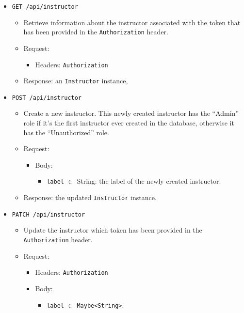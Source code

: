 \begin{chapterBody}
\begin{itemize}
    \item \texttt{GET /api/instructor}
    \begin{itemize}
        \item Retrieve information about the instructor associated with the token
that has been provided in the \texttt{Authorization} header.
        \item Request:
        \begin{itemize}
            \item Headers: \texttt{Authorization}
        \end{itemize}
        \item Response: an \texttt{Instructor} instance,
    \end{itemize}
\item \texttt{POST /api/instructor}
    \begin{itemize}
        \item Create a new instructor. This newly created instructor has the
``Admin'' role if it's the first instructor ever created in the database,
otherwise it has the ``Unauthorized'' role.
        \item Request:
        \begin{itemize}
            \item Body:
            \begin{itemize}
                \item \texttt{label} $ \in $ String: the label of the newly 
created instructor.
            \end{itemize}
        \end{itemize}
        \item Response: the updated \texttt{Instructor} instance.
    \end{itemize}
    \item \texttt{PATCH /api/instructor}
    \begin{itemize}
        \item Update the instructor which token has been provided in the
\texttt{Authorization} header.
        \item Request:
        \begin{itemize}
            \item Headers: \texttt{Authorization}
            \item Body:
            \begin{itemize}
                \item \texttt{label} $ \in $ \texttt{Maybe<String>}:

\end{itemize}
\end{itemize}
\end{itemize}
\end{itemize}
\end{chapterBody}
